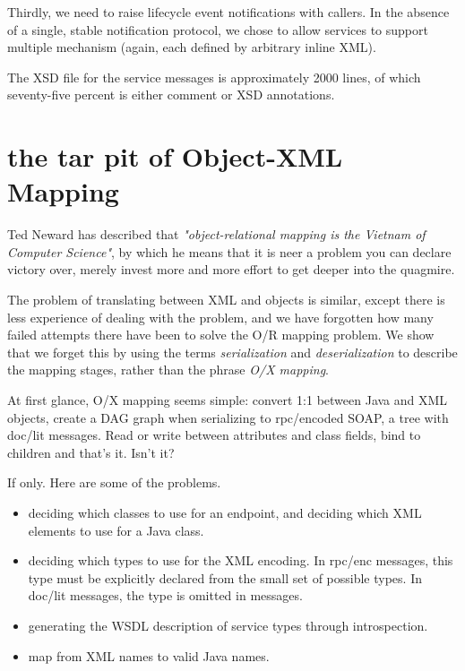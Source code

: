 \documentclass[draft]{paper}
\begin{document}
Thirdly, we need to raise lifecycle event notifications with callers. In the absence
of a single, stable notification protocol, we chose to allow services to support multiple
mechanism (again, each defined by arbitrary inline XML).

The XSD file for the service messages is approximately 2000 lines, of which  seventy-five percent
is either comment or XSD annotations. 

\section{the tar pit of Object-XML Mapping}

Ted Neward has described that \emph{"object-relational mapping is the Vietnam of
Computer Science"}, by which he means that it is neer a problem you can declare
victory over, merely invest more and more effort to get deeper into the
quagmire.

The problem of translating between XML and objects is similar, except there is
less experience of dealing with the problem, and we have forgotten how many
failed attempts there have been to solve the O/R mapping problem. We show that
we forget this by using the terms \emph{serialization} and \emph{deserialization} 
to describe the mapping stages, rather than the phrase \emph{O/X mapping}.

At first glance, O/X mapping seems simple: convert 1:1 between Java and XML
objects, create a DAG graph when serializing to rpc/encoded SOAP, a tree with
doc/lit messages. Read or write between attributes and class fields, bind to
children and that's it. Isn't it? 

If only. Here are some of the problems.

\begin{itemize}

\item deciding which classes to use for an endpoint, and
deciding which XML elements to use for a Java class. 

\item deciding which types to use for the XML encoding. In rpc/enc messages,
this type must be explicitly declared from the small set of possible types. In
doc/lit messages, the type is omitted in messages. 

\item generating the WSDL description of service types through introspection.

\item map from XML names to valid Java names.

\end{itemize}
\end{document}

